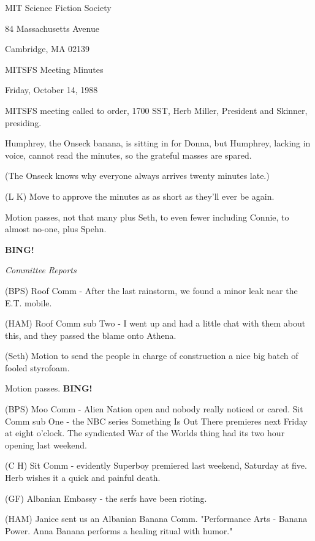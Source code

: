 \documentclass[12pt]{article}
\newcommand{\bing}{{\bf BING!} }
\newcommand{\goto}[1]{\bing \vskip 12pt \centerline{{\em{#1}}}}
\begin{document}
\begin{center}

MIT Science Fiction Society 

84 Massachusetts Avenue

Cambridge, MA 02139

\vspace{12pt}

MITSFS Meeting Minutes 

Friday, October 14, 1988

\end{center}
 
\vspace{18pt}

\setlength{\parskip}{6pt}

\noindent
MITSFS meeting called to order, 1700 SST, Herb Miller, President and Skinner, presiding.

Humphrey, the Onseck banana, is sitting in for Donna, but Humphrey, lacking in voice, cannot read the minutes, so the grateful masses are spared.

(The Onseck knows why everyone always arrives twenty minutes late.)

(L K) Move to approve the minutes as as short as they'll ever be again.

Motion passes, not that many plus Seth, to even fewer including Connie, to almost no-one, plus Spehn.

\goto{Committee Reports}

(BPS) Roof Comm - After the last rainstorm, we found a minor leak near the E.T. mobile.

(HAM) Roof Comm sub Two - I went up and had a little chat with them about this, and they passed the blame onto Athena.

(Seth) Motion to send the people in charge of construction a nice big batch of fooled styrofoam.

Motion passes. \bing

(BPS) Moo Comm - Alien Nation open and nobody really noticed or cared. Sit Comm sub One - the NBC series Something Is Out There premieres next Friday at eight o'clock. The syndicated War of the Worlds thing had its two hour opening last weekend.

(C H) Sit Comm - evidently Superboy premiered last weekend, Saturday at five. Herb wishes it a quick and painful death.

(GF) Albanian Embassy - the serfs have been rioting.

(HAM) Janice sent us an Albanian Banana Comm.  "Performance Arts - Banana Power. Anna Banana performs a healing ritual with humor."
\end{document}
